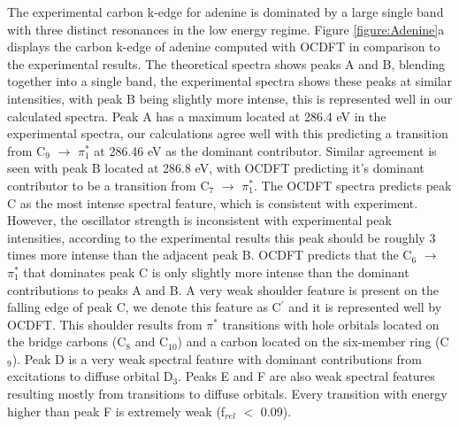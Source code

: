 \documentclass[12pt]{article}
\begin{document}
The experimental carbon k-edge for adenine is dominated by a large single band with three distinct resonances in the low energy regime. Figure \ref{figure:Adenine}a displays the carbon k-edge of adenine computed with OCDFT in comparison to the experimental results. The theoretical spectra shows peaks A and B, blending together into a single band, the experimental spectra shows these peaks at similar intensities, with peak B being slightly more intense, this is represented well in our calculated spectra. Peak A has a maximum located at 286.4 eV in the experimental spectra, our calculations agree well with this predicting a transition from C$_9$ $\rightarrow$ $\pi_1^*$ at 286.46 eV as the dominant contributor. Similar agreement is seen with peak B located at 286.8 eV, with OCDFT predicting it's dominant contributor to be a transition from C$_7$ $\rightarrow$ $\pi_1^*$.  The OCDFT spectra predicts peak C as the most intense spectral feature, which is consistent with experiment. However, the oscillator strength is inconsistent with experimental peak intensities, according to the experimental results this peak should be roughly 3 times more intense than the adjacent peak B. OCDFT predicts that the C$_6$ $\rightarrow$ $\pi^*_1$ that dominates peak C is only slightly more intense than the dominant contributions to peaks A and B. A very weak shoulder feature is present on the falling edge of peak C, we denote this feature as C$^{\prime}$ and it is represented well by OCDFT. This shoulder results from $\pi^*$ transitions with hole orbitals located on the bridge carbons (C$_8$ and C$_{10}$) and a carbon located on the six-member ring (C$_9$). Peak D is a very weak spectral feature with dominant contributions from excitations to diffuse orbital D$_3$. Peaks E and F are also weak spectral features resulting mostly from transitions to diffuse orbitals. Every transition with energy higher than peak F is extremely weak (f$_{rel}$ $<$ 0.09).
\end{document}

